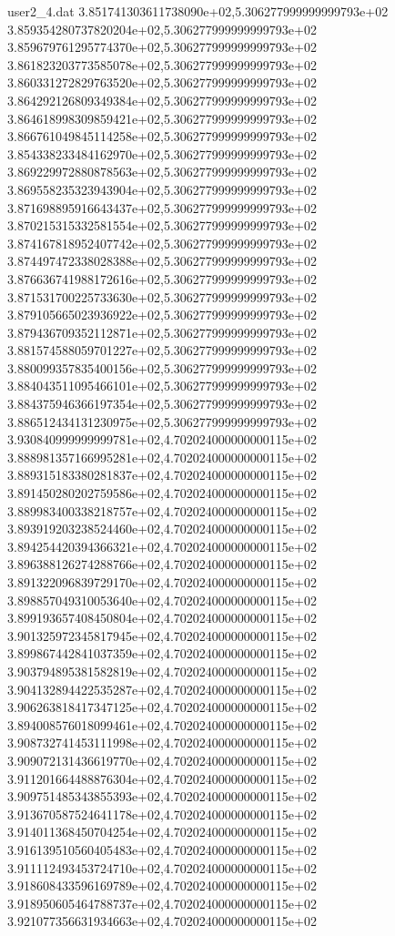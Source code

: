 \begin{filecontents}{user2_4.dat}
3.851741303611738090e+02,5.306277999999999793e+02
3.859354280737820204e+02,5.306277999999999793e+02
3.859679761295774370e+02,5.306277999999999793e+02
3.861823203773585078e+02,5.306277999999999793e+02
3.860331272829763520e+02,5.306277999999999793e+02
3.864292126809349384e+02,5.306277999999999793e+02
3.864618998309859421e+02,5.306277999999999793e+02
3.866761049845114258e+02,5.306277999999999793e+02
3.854338233484162970e+02,5.306277999999999793e+02
3.869229972880878563e+02,5.306277999999999793e+02
3.869558235323943904e+02,5.306277999999999793e+02
3.871698895916643437e+02,5.306277999999999793e+02
3.870215315332581554e+02,5.306277999999999793e+02
3.874167818952407742e+02,5.306277999999999793e+02
3.874497472338028388e+02,5.306277999999999793e+02
3.876636741988172616e+02,5.306277999999999793e+02
3.871531700225733630e+02,5.306277999999999793e+02
3.879105665023936922e+02,5.306277999999999793e+02
3.879436709352112871e+02,5.306277999999999793e+02
3.881574588059701227e+02,5.306277999999999793e+02
3.880099357835400156e+02,5.306277999999999793e+02
3.884043511095466101e+02,5.306277999999999793e+02
3.884375946366197354e+02,5.306277999999999793e+02
3.886512434131230975e+02,5.306277999999999793e+02
3.930840999999999781e+02,4.702024000000000115e+02
3.888981357166995281e+02,4.702024000000000115e+02
3.889315183380281837e+02,4.702024000000000115e+02
3.891450280202759586e+02,4.702024000000000115e+02
3.889983400338218757e+02,4.702024000000000115e+02
3.893919203238524460e+02,4.702024000000000115e+02
3.894254420394366321e+02,4.702024000000000115e+02
3.896388126274288766e+02,4.702024000000000115e+02
3.891322096839729170e+02,4.702024000000000115e+02
3.898857049310053640e+02,4.702024000000000115e+02
3.899193657408450804e+02,4.702024000000000115e+02
3.901325972345817945e+02,4.702024000000000115e+02
3.899867442841037359e+02,4.702024000000000115e+02
3.903794895381582819e+02,4.702024000000000115e+02
3.904132894422535287e+02,4.702024000000000115e+02
3.906263818417347125e+02,4.702024000000000115e+02
3.894008576018099461e+02,4.702024000000000115e+02
3.908732741453111998e+02,4.702024000000000115e+02
3.909072131436619770e+02,4.702024000000000115e+02
3.911201664488876304e+02,4.702024000000000115e+02
3.909751485343855393e+02,4.702024000000000115e+02
3.913670587524641178e+02,4.702024000000000115e+02
3.914011368450704254e+02,4.702024000000000115e+02
3.916139510560405483e+02,4.702024000000000115e+02
3.911112493453724710e+02,4.702024000000000115e+02
3.918608433596169789e+02,4.702024000000000115e+02
3.918950605464788737e+02,4.702024000000000115e+02
3.921077356631934663e+02,4.702024000000000115e+02

\end{filecontents}
